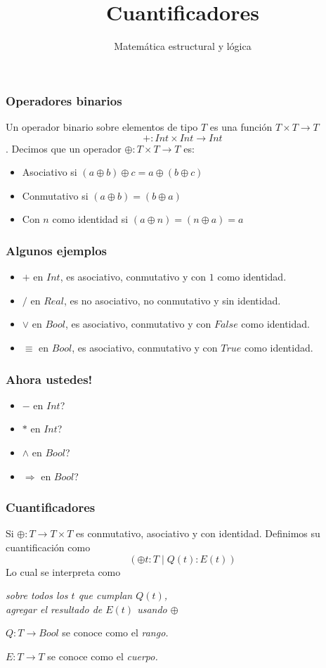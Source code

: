 \documentclass{beamer}
\title{Cuantificadores}
\author{Matemática estructural y lógica}
\institute{ISIS-1104}
\date{}
\newcommand{\then}{\Rightarrow}
\begin{document}
\frame{\titlepage}

\begin{frame}[fragile]
    \frametitle{Operadores binarios}
        Un operador binario sobre elementos de tipo $T$ es una función $T \times T \rightarrow T$
            $$+:Int \times Int \rightarrow Int$$.
        Decimos que un operador $\oplus:T \times T \rightarrow T$ es: 
        \begin{itemize}
            \item Asociativo si $(a \oplus b) \oplus c = a \oplus (b \oplus c)$
            \item Conmutativo si $(a \oplus b) = (b \oplus a)$
            \item Con $n$ como identidad si $(a \oplus n) = (n \oplus a) = a$
    \end{itemize}
\end{frame}

\begin{frame}[fragile]
    \frametitle{Algunos ejemplos}
    \begin{itemize}
        \item $+$ en $Int$, es asociativo, conmutativo y con $1$ como identidad.
        \item $/$ en $Real$, es no asociativo, no conmutativo y sin identidad.
        \item $\lor$ en $Bool$, es asociativo, conmutativo y con $False$ como identidad.
        \item $\equiv$ en $Bool$, es asociativo, conmutativo y con $True$ como identidad.
    \end{itemize}
\end{frame}

\begin{frame}[fragile]
    \frametitle{Ahora ustedes!}
    \begin{itemize}
        \item $-$ en $Int$?
        \item $*$ en $Int$?
        \item $\land$ en $Bool$?
        \item $\then$ en $Bool$?
    \end{itemize}
\end{frame}

\begin{frame}[fragile]
    \frametitle{Cuantificadores}
    Si $\oplus:T \rightarrow T \times T$ es conmutativo, asociativo y con identidad. Definimos su cuantificación como
        $$(\oplus t:T \mid Q(t):E(t))$$
    Lo cual se interpreta como
        \begin{center}
            \it{sobre todos los $t$ que cumplan $Q(t)$,\\ agregar el resultado de $E(t)$ usando $\oplus$}
        \end{center}
    $Q:T \rightarrow Bool$ se conoce como el \it rango.
    
    $E:T \rightarrow T$ se conoce como el \it cuerpo.
\end{frame}
\end{document}
